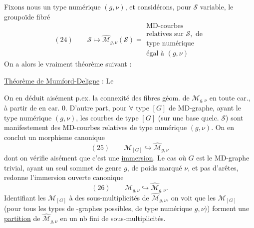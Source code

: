 Fixons nous un type numérique $(g,\nu)$, et considérons, pour $\mathcal S$ variable, le groupoïde fibré
\[
(24)\qquad\mathcal S\longmapsto\widehat{\mathcal M}_{g,\nu}(\mathcal S)=\begin{gathered}\text{MD-courbes}\\\text{relatives sur }\mathcal S,\text{ de}\\\text{type numérique}\\\text{égal à }(g,\nu)\end{gathered}
\]
On a alors le vraiment  théorème suivant :

\uline{Théorème de Mumford-Deligne} : Le


On en déduit aisément p.ex. la connexité des fibres géom. de $\mathcal M_{g,\nu}$ en toute car., à partir de   en car. $0$. D'autre part, pour $\forall$ type $[G]$ de MD-graphe, ayant le type numérique $(g,\nu)$, les courbes  de type $[G]$ (sur une base quelc. $\mathcal S$) sont manifestement des MD-courbes relatives de type numérique $(g,\nu)$. On en conclut un morphisme canonique
\[
(25)\qquad\mathcal M_{[G]}\hookrightarrow\widehat{\mathcal M}_{g,\nu}
\]
dont on vérifie aisément que c'est une \uline{immersion}. Le cas où $G$ est le
MD-graphe trivial, ayant un seul sommet de genre $g$, de poids marqué $\nu$, et pas d'arêtes, redonne l'immersion ouverte canonique
\[
(26)\qquad\mathcal M_{g,\nu}\hookrightarrow\widehat{\mathcal M}_{g,\nu}.
\]
Identifiant les $\mathcal M_{[G]}$ à des sous-multiplicités de $\widehat{\mathcal M}_{g,\nu}$, on voit que les $\mathcal M_{[G]}$ (pour tous les types de -graphes possibles, de type numérique $g,\nu)$) forment une \uline{partition} de $\widehat{\mathcal M}_{g,\nu}$ en un nb fini de sous-multiplicités.

